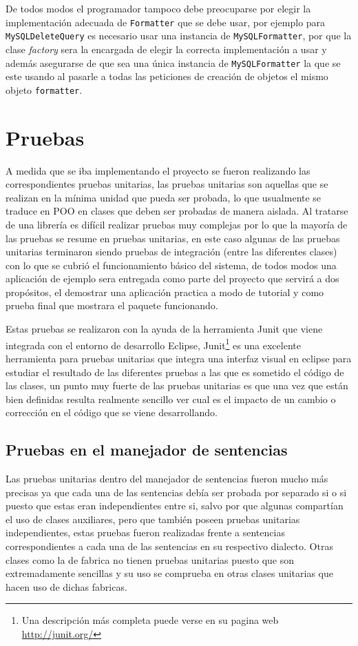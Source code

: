 De todos modos el programador tampoco debe preocuparse por elegir la implementación adecuada de \verb=Formatter= que se debe usar, por ejemplo para \verb=MySQLDeleteQuery= es necesario usar una instancia de \verb=MySQLFormatter=, por que la clase \textit{factory} sera la encargada de elegir la correcta implementación a usar y además asegurarse de que sea una única instancia de \verb=MySQLFormatter= la que se este usando al pasarle a todas las peticiones de creación de objetos el mismo objeto \verb=formatter=.
%
%
\section{Pruebas}
A medida que se iba implementando el proyecto se fueron realizando las correspondientes pruebas unitarias, las pruebas unitarias son aquellas que se realizan en la mínima unidad que pueda ser probada, lo que usualmente se traduce en POO en clases que deben ser probadas de manera aislada. Al tratarse de una librería es difícil realizar pruebas muy complejas por lo que la mayoría de las pruebas se resume en pruebas unitarias, en este caso algunas de las pruebas unitarias terminaron siendo pruebas de integración (entre las diferentes clases) con lo que se cubrió el funcionamiento básico del sistema, de todos modos una aplicación de ejemplo sera entregada como parte del proyecto que servirá a dos propósitos, el demostrar una aplicación practica a modo de tutorial y como prueba final que mostrara el paquete funcionando.

Estas pruebas se realizaron con la ayuda de la herramienta Junit que viene integrada con el entorno de desarrollo Eclipse, Junit\footnote{Una descripción más completa puede verse en su pagina web \url{http://junit.org/}} es una excelente herramienta para pruebas unitarias que integra una interfaz visual en eclipse para estudiar el resultado de las diferentes pruebas a las que es sometido el código de las clases, un punto muy fuerte de las pruebas unitarias es que una vez que están bien definidas resulta realmente sencillo ver cual es el impacto de un cambio o corrección en el código que se viene desarrollando.
%
\subsection{Pruebas en el manejador de sentencias}
Las pruebas unitarias dentro del manejador de sentencias fueron mucho más precisas ya que cada una de las sentencias debía ser probada por separado si o si puesto que estas eran independientes entre si, salvo por que algunas compartían el uso de clases auxiliares, pero que también poseen pruebas unitarias independientes, estas pruebas fueron realizadas frente a sentencias correspondientes a cada una de las sentencias en su respectivo dialecto. Otras clases como la de fabrica no tienen pruebas unitarias puesto que son extremadamente sencillas y su uso se comprueba en otras clases unitarias que hacen uso de dichas fabricas.


